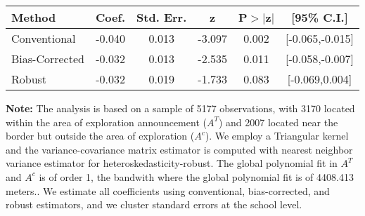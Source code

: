 \begin{table}[htbp]\centering
 \footnotesize 
\begin{tabular}{lccccc}
\hline\hline
Method & Coef. & Std. Err. & z & P$>|$z$|$ & [95\% C.I.] \\ 
\hline \hline  
Conventional & -0.040 & 0.013 & -3.097 & 0.002 & [-0.065,-0.015] \\ 
 Bias-Corrected & -0.032 & 0.013 & -2.535 & 0.011 & [-0.058,-0.007] \\ 
Robust & -0.032 & 0.019 & -1.733 & 0.083 & [-0.069,0.004] \\ 
  \hline\hline
\end{tabular}
\label{table:rd}
\begin{tablenotes} 
  \justifying \tiny \textbf{Note: }    
   The analysis is based on a sample of 5177 observations, with 3170 located within the area of exploration announcement ($A^{T}$) and 2007 located near the border but outside the area of exploration  ($A^{c}$). 
           We employ a Triangular kernel and the variance-covariance matrix estimator is computed with nearest neighbor variance estimator for heteroskedasticity-robust. The global polynomial fit in  $A^{T}$ and $A^{c}$ is of order 1, the bandwith where the global polynomial fit is of 4408.413 meters.. We estimate all coefficients using conventional, bias-corrected, and robust estimators, and we cluster standard errors at the school level. \end{tablenotes} 
 \end{table} 
